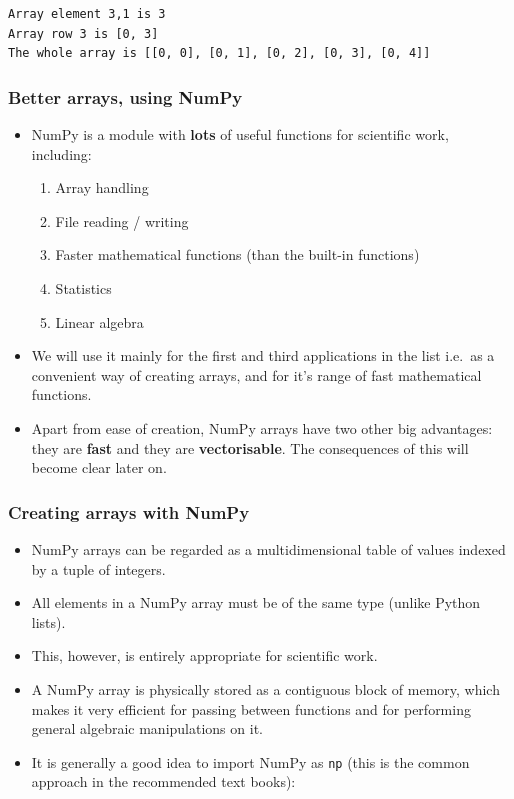 \documentclass[10pt]{article}
\providecommand{\tightlist}{%
      \setlength{\itemsep}{0pt}\setlength{\parskip}{0pt}}
\begin{document}
    \begin{Verbatim}[commandchars=\\\{\}]
Array element 3,1 is 3
Array row 3 is [0, 3]
The whole array is [[0, 0], [0, 1], [0, 2], [0, 3], [0, 4]]
    \end{Verbatim}

    \hypertarget{better-arrays-using-numpy}{%
\subsubsection{Better arrays, using
NumPy}\label{better-arrays-using-numpy}}

\begin{itemize}
\item
  NumPy is a module with \textbf{lots} of useful functions for
  scientific work, including:

\begin{enumerate}
\def\labelenumi{\arabic{enumi}.}
\tightlist
\item
  Array handling
\item
  File reading / writing
\item
  Faster mathematical functions (than the built-in functions)
\item
  Statistics
\item
  Linear algebra
\end{enumerate}

\item
  We will use it mainly for the first and third applications in the list
  i.e.~as a convenient way of creating arrays, and for it's range of
  fast mathematical functions.
\item
  Apart from ease of creation, NumPy arrays have two other big
  advantages: they are \textbf{fast} and they are \textbf{vectorisable}.
  The consequences of this will become clear later on.
\end{itemize}

\hypertarget{creating-arrays-with-numpy}{%
\subsubsection{Creating arrays with
NumPy}\label{creating-arrays-with-numpy}}

\begin{itemize}
\tightlist
\item
  NumPy arrays can be regarded as a multidimensional table of values
  indexed by a tuple of integers.
\item
  All elements in a NumPy array must be of the same type (unlike Python
  lists).
\item
  This, however, is entirely appropriate for scientific work.
\item
  A NumPy array is physically stored as a contiguous block of memory,
  which makes it very efficient for passing between functions and for
  performing general algebraic manipulations on it.
\item
  It is generally a good idea to import NumPy as \texttt{np} (this is
  the common approach in the recommended text books):
\end{itemize}
\end{document}
